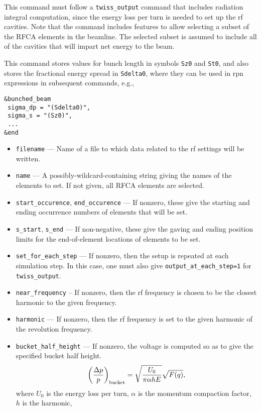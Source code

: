 \documentclass[11pt]{article}
\begin{document}
This command must follow a \verb|twiss_output| command that includes radiation integral computation, since the 
energy loss per turn is needed to set up the rf cavities.
Note that the command includes features to allow selecting a subset of the RFCA elements in the beamline.
The selected subset is assumed to include all of the cavities that will impart net energy to the beam.

This command stores values for bunch length in symbols \verb|Sz0| and \verb|St0|, and also stores the fractional
energy spread in \verb|Sdelta0|, where they can be used in rpn expressions in subsequent  commands, e.g.,
\begin{verbatim}
&bunched_beam
 sigma_dp = "(Sdelta0)",
 sigma_s = "(Sz0)",
 ...
&end
\end{verbatim}

\begin{itemize}
\item \verb|filename| --- Name of a file to which data related to the rf settings will be written.
\item \verb|name| --- A possibly-wildcard-containing string giving the names of the
        elements to set.  If not given, all RFCA elements are selected.
\item \verb|start_occurence|, \verb|end_occurence| --- If nonzero, these give the starting and
 ending occurrence numbers of elements that will be set. 
\item \verb|s_start|, \verb|s_end| --- If non-negative, these give the gaving and ending position
 limits for the end-of-element locations of elements to be set.
\item \verb|set_for_each_step| --- If nonzero, then the setup is repeated at each simulation step.
  In this case, one must also give \verb|output_at_each_step=1| for \verb|twiss_output|.
\item \verb|near_frequency| -- If nonzero, then the rf frequency is chosen to be the closest harmonic
  to the given frequency.
\item \verb|harmonic| --- If nonzero, then the rf frequency is set to the given harmonic of the revolution
  frequency.
\item \verb|bucket_half_height| --- If nonzero, the voltage is computed so as to give the specified bucket
  half height. 
\begin{equation}
\left(\frac{\Delta p}{p}\right)_{\rm bucket} = \sqrt{\frac{U_0}{\pi \alpha h E}}\sqrt{F(q)},
\end{equation} 
where $U_0$ is the energy loss per turn, $\alpha$ is the momentum compaction factor, $h$ is the harmonic, 

\end{itemize}
\end{document}

